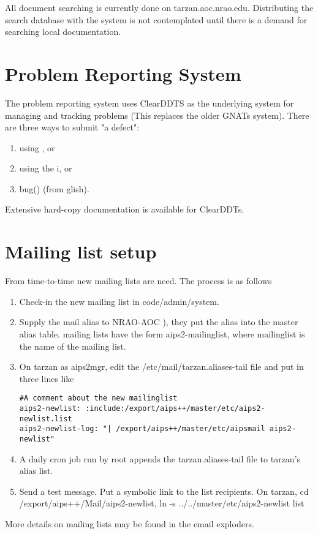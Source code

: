 All document searching is currently done on tarzan.aoc.nrao.edu.  Distributing
the search database with the system is not contemplated until there is a
demand for searching local documentation.

\section{\aips Problem Reporting System}
The \aips problem reporting system uses ClearDDTS as the underlying
system for managing and tracking problems (This replaces the older GNATs system). There are
three ways to submit
"a defect":
\begin{enumerate}
\item using , or
\item using the i, or
\item bug() (from glish).
\end{enumerate} 
Extensive hard-copy documentation is available for ClearDDTs.


\section{Mailing list setup}
From time-to-time new mailing lists are need.  The process is as follows
\begin{enumerate}

\item Check-in the new mailing list in code/admin/system.
\item Supply the mail alias to NRAO-AOC ), they put the alias into the master
alias table.  \aips
mailing lists have the form aips2-mailinglist, where mailinglist is the name
of the mailing list.
\item On tarzan as aips2mgr,
edit the /etc/mail/tarzan.aliases-tail file and put in three lines like
\begin{verbatim}
#A comment about the new mailinglist
aips2-newlist: :include:/export/aips++/master/etc/aips2-newlist.list
aips2-newlist-log: "| /export/aips++/master/etc/aipsmail aips2-newlist"
\end{verbatim}
\item A daily cron job run by root appends the tarzan.aliases-tail file to
tarzan's alias list.
\item Send a test message.  Put a symbolic link to the list recipients.
On tarzan, cd /export/aips++/Mail/aips2-newlist, ln -s ../../master/etc/aips2-newlist list
\end{enumerate}
More details on \aips mailing lists may be found in the
 {email exploders}.
